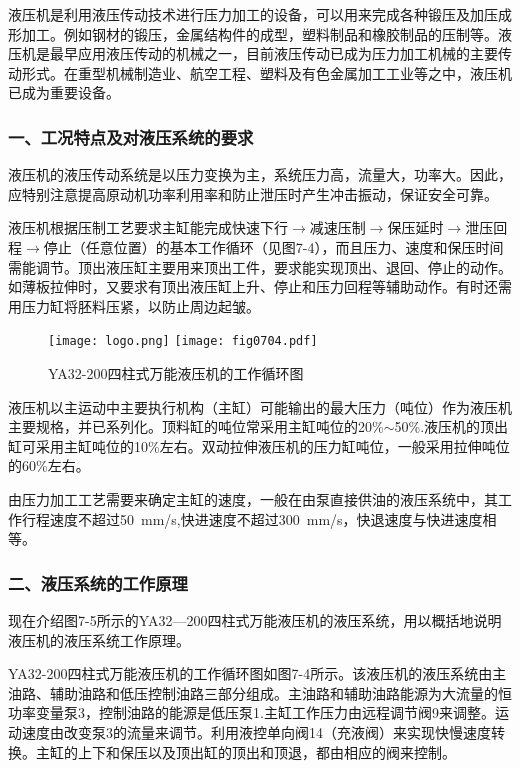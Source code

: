 液压机是利用液压传动技术进行压力加工的设备，可以用来完成各种锻压及加压成形加工。例如钢材的锻压，金属结构件的成型，塑料制品和橡胶制品的压制等。液压机是最早应用液压传动的机械之一，目前液压传动已成为压力加工机械的主要传动形式。在重型机械制造业、航空工程、塑料及有色金属加工工业等之中，液压机已成为重要设备。

\subsubsection*{一、工况特点及对液压系统的要求}

液压机的液压传动系统是以压力变换为主，系统压力高，流量大，功率大。因此，应特别注意提高原动机功率利用率和防止泄压时产生冲击振动，保证安全可靠。

液压机根据压制工艺要求主缸能完成快速下行$\rightarrow$减速压制$\rightarrow$保压延时$\rightarrow$泄压回程$\rightarrow$停止（任意位置）的基本工作循环（见图7-4），而且压力、速度和保压时间需能调节。顶出液压缸主要用来顶出工件，要求能实现顶出、退回、停止的动作。如薄板拉伸时，又要求有顶出液压缸上升、停止和压力回程等辅助动作。有时还需用压力缸将胚料压紧，以防止周边起皱。

\begin{figure}
    \centering
    \ifOpenSource
    \texttt{[image: logo.png]}
    \else
    \texttt{[image: fig0704.pdf]}%
    \fi
    \caption{YA32-200四柱式万能液压机的工作循环图}
    \label{fig:fig0704}%
\end{figure}

液压机以主运动中主要执行机构（主缸）可能输出的最大压力（吨位）作为液压机主要规格，并已系列化。顶料缸的吨位常采用主缸吨位的20\%$\sim$50\%.液压机的顶出缸可采用主缸吨位的10\%左右。双动拉伸液压机的压力缸吨位，一般采用拉伸吨位的60\%左右。

由压力加工工艺需要来确定主缸的速度，一般在由泵直接供油的液压系统中，其工作行程速度不超过50\ mm/s,快进速度不超过300\ mm/s，快退速度与快进速度相等。

\subsubsection*{二、液压系统的工作原理}

现在介绍图7-5所示的YA32—200四柱式万能液压机的液压系统，用以概括地说明液压机的液压系统工作原理。

YA32-200四柱式万能液压机的工作循环图如图7-4所示。该液压机的液压系统由主油路、辅助油路和低压控制油路三部分组成。主油路和辅助油路能源为大流量的恒功率变量泵3，控制油路的能源是低压泵1.主缸工作压力由远程调节阀9来调整。运动速度由改变泵3的流量来调节。利用液控单向阀14（充液阀）来实现快慢速度转换。主缸的上下和保压以及顶出缸的顶出和顶退，都由相应的阀来控制。

